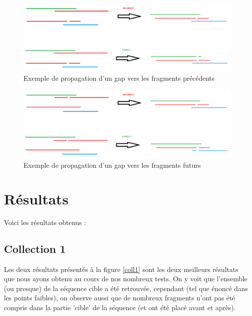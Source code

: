 \documentclass[12pt,a4paper,final]{article}
\begin{document}
\begin{figure}[!ht]
\centering
	\includegraphics[width=1\textwidth]{images/gapPrecedent.png}
	\caption{\label{gapPrecedent}Exemple de propagation d'un gap vers les fragments précédents}
\end{figure}

\begin{figure}[!ht]
\centering
	\includegraphics[width=1\textwidth]{images/gapSuivant.png}
	\caption{\label{gapSuivant}Exemple de propagation d'un gap vers les fragments futurs}
\end{figure}

\newpage
\section{Résultats}
Voici les résultats obtenus : 

\subsection{Collection 1}
Les deux résultats présentés à la figure \ref{coll1} sont les deux meilleurs résultats que nous ayons obtenu au cours de nos nombreux tests. On y voit que l'ensemble (ou presque) de la séquence cible a été retrouvée, cependant (tel que énoncé dans les points faibles), on observe aussi que de nombreux fragments n'ont pas été compris dans la partie 'cible' de la séquence (et ont été placé avant et après).
\end{document}
